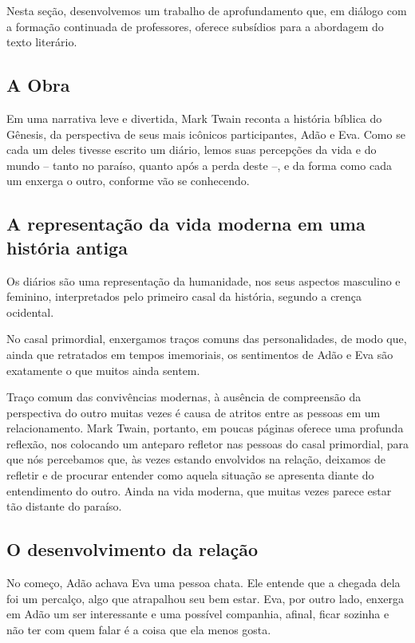 \documentclass[12pt]{extarticle}
\begin{document}
Nesta seção, desenvolvemos um trabalho de aprofundamento que, em diálogo
com a formação continuada de professores, oferece subsídios para a
abordagem do texto literário.

\subsection{A Obra}

Em uma narrativa leve e divertida, Mark Twain reconta a história bíblica
do Gênesis, da perspectiva de seus mais icônicos participantes, Adão e
Eva. Como se cada um deles tivesse escrito um diário, lemos suas
percepções da vida e do mundo -- tanto no paraíso, quanto após a perda
deste --, e da forma como cada um enxerga o outro, conforme vão se
conhecendo.

\subsection{A representação da vida moderna em uma história antiga}

Os diários são uma representação da humanidade, nos seus aspectos
masculino e feminino, interpretados pelo primeiro casal da história,
segundo a crença ocidental.

No casal primordial, enxergamos traços comuns das personalidades, de
modo que, ainda que retratados em tempos imemoriais, os sentimentos de
Adão e Eva são exatamente o que muitos ainda sentem.

Traço comum das convivências modernas, à ausência de compreensão da
perspectiva do outro muitas vezes é causa de atritos entre as pessoas em
um relacionamento. Mark Twain, portanto, em poucas páginas oferece uma
profunda reflexão, nos colocando um anteparo refletor nas pessoas do
casal primordial, para que nós percebamos que, às vezes estando
envolvidos na relação, deixamos de refletir e de procurar entender como
aquela situação se apresenta diante do entendimento do outro. Ainda na
vida moderna, que muitas vezes parece estar tão distante do paraíso.

\subsection{O desenvolvimento da relação}

No começo, Adão achava Eva uma pessoa chata. Ele entende que a chegada
dela foi um percalço, algo que atrapalhou seu bem estar. Eva, por outro
lado, enxerga em Adão um ser interessante e uma possível companhia,
afinal, ficar sozinha e não ter com quem falar é a coisa que ela menos
gosta.
\end{document}
